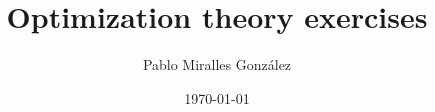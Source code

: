 \documentclass[a4paper]{article}
\title{Optimization theory exercises}
\author{Pablo Miralles González}
\date{\today}
\begin{document}
  \maketitle
  
  \begin{enumerate}
    
    
    
  \end{enumerate}
\end{document}
